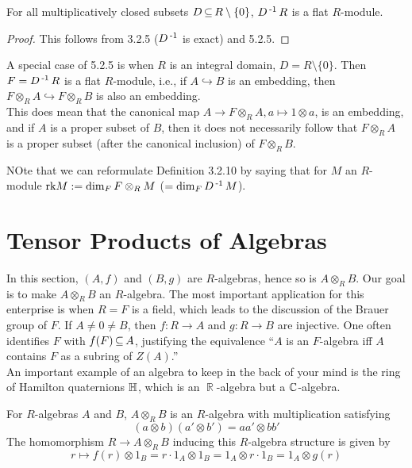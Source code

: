 \documentclass[11pt]{book}
\theoremstyle{definition}   \newtheorem{defn}[counter]{Definition} %
\newcommand{\bs}{\setminus}   \newcommand{\A}{\mathcal{A}}   \newcommand{\sy}{\textnormal{Syl}}   \newcommand{\size}[1]{\left| #1 \right|}
\DeclareMathOperator{\R}{\mathbb{R}}   \DeclareMathOperator{\N}{\mathbb{N}}   \DeclareMathOperator{\z}{\mathbb{Z}}   \DeclareMathOperator{\Q}{\mathbb{Q}}
\DeclareMathOperator{\ra}{\rightarrow}   \DeclareMathOperator{\Poly}{\mathbf{P}}   \DeclareMathOperator{\spn}{\textnormal{span}}   \DeclareMathOperator{\aut}{\textnormal{Aut}}
\newcommand{\vs}{\vspace{8pt}}   \newcommand{\hs}{\hspace{8pt}}
\numberwithin{counter}{chapter}
\begin{document}
\vs

\begin{corollary}
For all multiplicatively closed subsets $D \sub R \bs \{0\}$, $D\operatorname{^{-1}} R$ is a flat $R$-module.
\end{corollary}

\begin{proof}
This follows from 3.2.5 ($D\operatorname{^{-1}}$ is exact) and 5.2.5. 
\end{proof}

\vs

A special case of 5.2.5 is when $R$ is an integral domain, $D = R \bs \{0\}$. Then $F = D\operatorname{^{-1}} R$ is a flat $R$-module, i.e., if $A \hookrightarrow B$ is an embedding, then $F \otimes_R A \hookrightarrow F \otimes_R B$ is also an embedding. \\

\noindent {} This does  mean that the canonical map $A \ra F \otimes_R A, a \mapsto 1 \otimes a$, is an embedding, and if $A$ is a proper subset of $B$, then it does not necessarily follow that $F \otimes_R A$ is a proper subset (after the canonical inclusion) of $F \otimes_R B$. 

\vs

NOte that we can reformulate Definition 3.2.10 by saying that for $M$ an $R$-module $\textnormal{rk} M := \dim_F F \otimes_R M$ ($= \dim_F D\operatorname{^{-1}} M$). 

\section*{Tensor Products of Algebras}

In this section, $(A,f)$ and $(B,g)$ are $R$-algebras, hence so is $A \otimes_R B$. Our goal is to make $A \otimes_R B$ an $R$-algebra. The most important application for this enterprise is when $R = F$ is a field, which leads to the discussion of the Brauer group of $F$. If $A \ne 0 \ne B$, then $f : R \ra A$ and $g : R \ra B$ are injective. One often identifies $F$ with $f(F) \operatorname{\subseteq} A$, justifying the equivalence ``$A$ is an $F$-algebra iff $A$ contains $F$ as a subring of $Z(A)$.'' \\

An important example of an algebra to keep in the back of your mind is the ring of Hamilton quaternions $\mathbb{H}$, which is an $\R$-algebra but  a $\operatorname{\mathbb{C}}$-algebra. 

\vs

\begin{lemma}
For $R$-algebras $A$ and $B$, $A \otimes_R B$ is an $R$-algebra with multiplication satisfying
	\[(a \otimes b) (a' \otimes b') = aa' \otimes bb' \]
The homomorphism $R \ra A \otimes_R B$ inducing this $R$-algebra structure is given by 
	\[r \mapsto f(r) \otimes 1_B = r \cdot 1_A \otimes 1_B = 1_A \otimes r \cdot 1_B = 1_A \otimes g(r) \]
\end{lemma}
\end{document}
